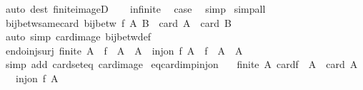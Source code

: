 \begin{isabellebody}
\ {\isacharparenleft}{\kern0pt}auto\ dest{\isacharcolon}{\kern0pt}\ finite{\isacharunderscore}{\kern0pt}imageD{\isacharparenright}{\kern0pt}\isanewline
\ \ \isamarkupfalse%
\ infinite\ \isamarkupfalse%
\ {\isacharquery}{\kern0pt}case\ \isamarkupfalse%
\ simp\isanewline
{}\isamarkupfalse%
\ simp{\isacharunderscore}{\kern0pt}all%
\endisatagproof
{\isafoldproof}%
%
\isadelimproof
\isanewline
%
\endisadelimproof
\isanewline
{}\isamarkupfalse%
\ bij{\isacharunderscore}{\kern0pt}betw{\isacharunderscore}{\kern0pt}same{\isacharunderscore}{\kern0pt}card{\isacharcolon}{\kern0pt}\ {\isachardoublequoteopen}bij{\isacharunderscore}{\kern0pt}betw\ f\ A\ B\ {\isasymLongrightarrow}\ card\ A\ {\isacharequal}{\kern0pt}\ card\ B{\isachardoublequoteclose}\isanewline
%
\isadelimproof
\ \ %
\endisadelimproof
%
\isatagproof
{}\isamarkupfalse%
\ {\isacharparenleft}{\kern0pt}auto\ simp{\isacharcolon}{\kern0pt}\ card{\isacharunderscore}{\kern0pt}image\ bij{\isacharunderscore}{\kern0pt}betw{\isacharunderscore}{\kern0pt}def{\isacharparenright}{\kern0pt}%
\endisatagproof
{\isafoldproof}%
%
\isadelimproof
\isanewline
%
\endisadelimproof
\isanewline
{}\isamarkupfalse%
\ endo{\isacharunderscore}{\kern0pt}inj{\isacharunderscore}{\kern0pt}surj{\isacharcolon}{\kern0pt}\ {\isachardoublequoteopen}finite\ A\ {\isasymLongrightarrow}\ f\ {\isacharbackquote}{\kern0pt}\ A\ {\isasymsubseteq}\ A\ {\isasymLongrightarrow}\ inj{\isacharunderscore}{\kern0pt}on\ f\ A\ {\isasymLongrightarrow}\ f\ {\isacharbackquote}{\kern0pt}\ A\ {\isacharequal}{\kern0pt}\ A{\isachardoublequoteclose}\isanewline
%
\isadelimproof
\ \ %
\endisadelimproof
%
\isatagproof
{}\isamarkupfalse%
\ {\isacharparenleft}{\kern0pt}simp\ add{\isacharcolon}{\kern0pt}\ card{\isacharunderscore}{\kern0pt}seteq\ card{\isacharunderscore}{\kern0pt}image{\isacharparenright}{\kern0pt}%
\endisatagproof
{\isafoldproof}%
%
\isadelimproof
\isanewline
%
\endisadelimproof
\isanewline
{}\isamarkupfalse%
\ eq{\isacharunderscore}{\kern0pt}card{\isacharunderscore}{\kern0pt}imp{\isacharunderscore}{\kern0pt}inj{\isacharunderscore}{\kern0pt}on{\isacharcolon}{\kern0pt}\isanewline
\ \ \ {\isachardoublequoteopen}finite\ A{\isachardoublequoteclose}\ {\isachardoublequoteopen}card{\isacharparenleft}{\kern0pt}f\ {\isacharbackquote}{\kern0pt}\ A{\isacharparenright}{\kern0pt}\ {\isacharequal}{\kern0pt}\ card\ A{\isachardoublequoteclose}\isanewline
\ \ \ {\isachardoublequoteopen}inj{\isacharunderscore}{\kern0pt}on\ f\ A{\isachardoublequoteclose}\isanewline

\end{isabellebody}
